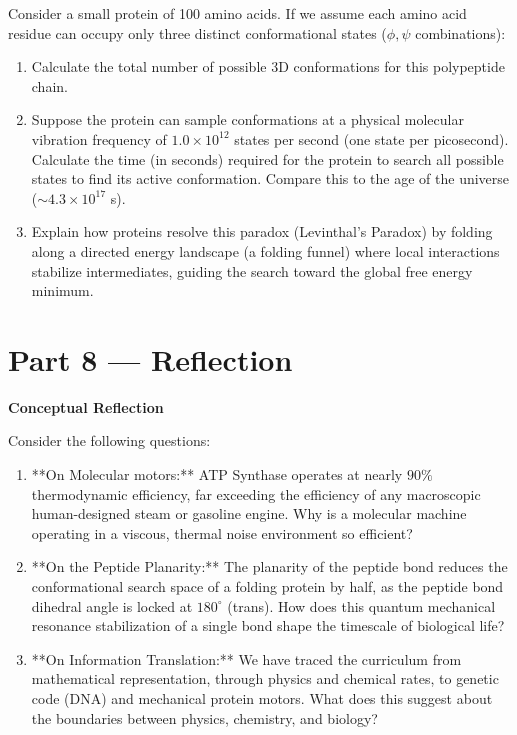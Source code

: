 \documentclass[12pt, a4paper]{book}
\begin{document}
\begin{deepbox}
\begin{enumerate}[label=\textbf{D\arabic*.}]
        Consider a small protein of 100 amino acids.
        If we assume each amino acid residue can occupy only three distinct conformational states ($\phi, \psi$ combinations):
        \begin{enumerate}[label=(\alph*)]
          \item Calculate the total number of possible 3D conformations for this polypeptide chain.
          \item Suppose the protein can sample conformations at a physical molecular vibration frequency of $1.0 \times 10^{12}$ states per second (one state per picosecond).
                Calculate the time (in seconds) required for the protein to search all possible states to find its active conformation. Compare this to the age of the universe ($\sim 4.3 \times 10^{17}$ s).
          \item Explain how proteins resolve this paradox (Levinthal's Paradox) by folding along a directed energy landscape (a folding funnel) where local interactions stabilize intermediates, guiding the search toward the global free energy minimum.
        \end{enumerate}
\end{enumerate}
\end{deepbox}

\newpage

\section{Part 8 --- Reflection}

\begin{reflectionbox}
\textbf{Conceptual Reflection}

Consider the following questions:
\begin{enumerate}
  \item **On Molecular motors:** ATP Synthase operates at nearly $90\%$ thermodynamic efficiency, far exceeding the efficiency of any macroscopic human-designed steam or gasoline engine. Why is a molecular machine operating in a viscous, thermal noise environment so efficient?
  \item **On the Peptide Planarity:** The planarity of the peptide bond reduces the conformational search space of a folding protein by half, as the peptide bond dihedral angle is locked at $180^\circ$ (trans). How does this quantum mechanical resonance stabilization of a single bond shape the timescale of biological life?
  \item **On Information Translation:** We have traced the curriculum from mathematical representation, through physics and chemical rates, to genetic code (DNA) and mechanical protein motors. What does this suggest about the boundaries between physics, chemistry, and biology?
\end{enumerate}
\end{reflectionbox}
\end{document}

